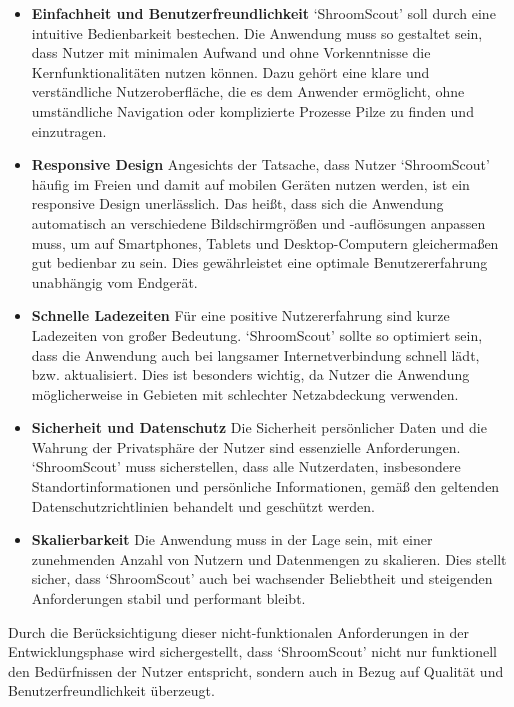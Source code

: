 \documentclass[../main.tex]{subfiles} %
\begin{document}
\begin{itemize}

	\item \textbf{Einfachheit und Benutzerfreundlichkeit}
	      `ShroomScout' soll durch eine intuitive Bedienbarkeit bestechen. Die Anwendung muss so gestaltet sein, dass Nutzer mit
	      minimalen Aufwand und ohne Vorkenntnisse die Kernfunktionalitäten nutzen können. Dazu gehört eine klare und verständliche
	      Nutzeroberfläche, die es dem Anwender ermöglicht, ohne umständliche Navigation oder komplizierte Prozesse Pilze zu finden
	      und einzutragen.

	\item \textbf{Responsive Design}
	      Angesichts der Tatsache, dass Nutzer `ShroomScout' häufig im Freien und damit auf mobilen Geräten nutzen werden, ist ein
	      responsive Design unerlässlich. Das heißt, dass sich die Anwendung automatisch an verschiedene Bildschirmgrößen und -auflösungen
	      anpassen muss, um auf Smartphones, Tablets und Desktop-Computern gleichermaßen gut bedienbar zu sein. Dies gewährleistet eine
	      optimale Benutzererfahrung unabhängig vom Endgerät.

	\item \textbf{Schnelle Ladezeiten}
	      Für eine positive Nutzererfahrung sind kurze Ladezeiten von großer Bedeutung. `ShroomScout' sollte so optimiert sein, dass die
	      Anwendung auch bei langsamer Internetverbindung schnell lädt, bzw. aktualisiert. Dies ist besonders wichtig, da Nutzer die Anwendung
	      möglicherweise in Gebieten mit schlechter Netzabdeckung verwenden.

	\item \textbf{Sicherheit und Datenschutz}
	      Die Sicherheit persönlicher Daten und die Wahrung der Privatsphäre der Nutzer sind essenzielle Anforderungen. `ShroomScout'
	      muss sicherstellen, dass alle Nutzerdaten, insbesondere Standortinformationen und persönliche Informationen, gemäß den
	      geltenden Datenschutzrichtlinien behandelt und geschützt werden.

	\item \textbf{Skalierbarkeit}
	      Die Anwendung muss in der Lage sein, mit einer zunehmenden Anzahl von Nutzern und Datenmengen zu skalieren. Dies stellt
	      sicher, dass `ShroomScout' auch bei wachsender Beliebtheit und steigenden Anforderungen stabil und performant bleibt.

\end{itemize}

Durch die Berücksichtigung dieser nicht-funktionalen Anforderungen in der Entwicklungsphase wird sichergestellt, dass `ShroomScout'
nicht nur funktionell den Bedürfnissen der Nutzer entspricht, sondern auch in Bezug auf Qualität und Benutzerfreundlichkeit überzeugt.
\end{document}
